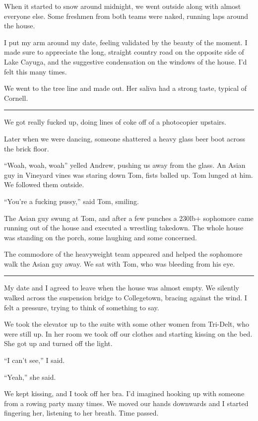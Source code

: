 When it started to snow around midnight, we went outside along with almost
everyone else.  Some freshmen from both teams were naked, running laps around
the house.

I put my arm around my date, feeling validated by the beauty of the moment.   I
made sure to appreciate the long, straight country road on the opposite side of
Lake Cayuga, and the suggestive condensation on the windows of the house.  I'd
felt this many times. 

We went to the tree line and made out.  Her saliva had a strong taste, typical
of Cornell.

\plainfancybreak{12pt}{2}{* * *}

We got really fucked up, doing lines of coke off of a photocopier upstairs.

Later when we were dancing, someone shattered a heavy glass beer boot across
the brick floor.  

``Woah, woah, woah'' yelled Andrew, pushing us away from the glass.  An Asian
guy in Vineyard vines was staring down Tom, fists balled up.  Tom lunged at him.
We followed them outside.

``You're a fucking pussy,'' said Tom, smiling.

The Asian guy swung at Tom, and after a few punches a 230lb+ sophomore came
running out of the house and executed a wrestling takedown.  The whole house was
standing on the porch, some laughing and some concerned.

The commodore of the heavyweight team appeared and helped the sophomore walk the
Asian guy away.  We sat with Tom, who was bleeding from his eye.

\plainfancybreak{12pt}{2}{* * *}

My date and I agreed to leave when the house was almost empty.  We silently
walked across the suspension bridge to Collegetown, bracing against the wind.  I
felt a pressure, trying to think of something to say.

We took the elevator up to the suite with some other women from Tri-Delt, who
were still up.  In her room we took off our clothes and starting kissing on the
bed.  She got up and turned off the light.

``I can't see,'' I said.  

``Yeah,'' she said.

We kept kissing, and I took off her bra.  I'd imagined hooking up with someone
from a rowing party many times.  We moved our hands downwards and I started
fingering her, listening to her breath.  Time passed.

